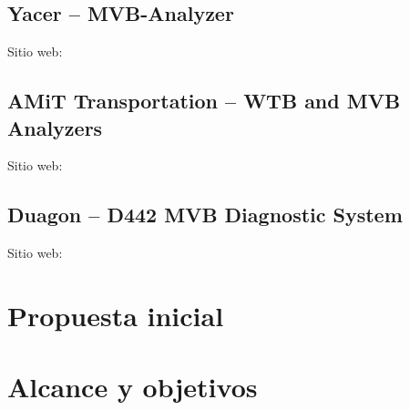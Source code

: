 \subsection{Yacer -- MVB-Analyzer}

Sitio web: \cite{yacer}

\subsection{AMiT Transportation -- WTB and MVB Analyzers}

Sitio web: \cite{amit}

\subsection{Duagon -- D442 MVB Diagnostic System}

Sitio web: \cite{duagon}


\section{Propuesta inicial}



\section{Alcance y objetivos}
